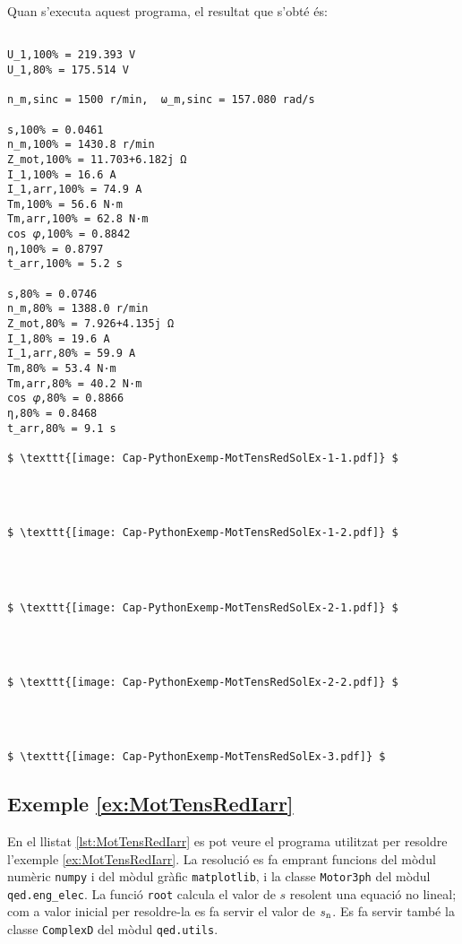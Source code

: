 Quan s'executa aquest programa, el resultat que s'obté és:
\lstset{
	language=,
	numbers=none,
	frame=none
}
\begin{lstlisting}[mathescape=true]
	
U_1,100% = 219.393 V
U_1,80% = 175.514 V

n_m,sinc = 1500 r/min,  ω_m,sinc = 157.080 rad/s

s,100% = 0.0461
n_m,100% = 1430.8 r/min
Z_mot,100% = 11.703+6.182j Ω
I_1,100% = 16.6 A
I_1,arr,100% = 74.9 A
Tm,100% = 56.6 N·m
Tm,arr,100% = 62.8 N·m
cos 𝜑,100% = 0.8842
η,100% = 0.8797
t_arr,100% = 5.2 s

s,80% = 0.0746
n_m,80% = 1388.0 r/min
Z_mot,80% = 7.926+4.135j Ω
I_1,80% = 19.6 A
I_1,arr,80% = 59.9 A
Tm,80% = 53.4 N·m
Tm,arr,80% = 40.2 N·m
cos 𝜑,80% = 0.8866
η,80% = 0.8468
t_arr,80% = 9.1 s

$ \texttt{[image: Cap-PythonExemp-MotTensRedSolEx-1-1.pdf]} $




$ \texttt{[image: Cap-PythonExemp-MotTensRedSolEx-1-2.pdf]} $




$ \texttt{[image: Cap-PythonExemp-MotTensRedSolEx-2-1.pdf]} $




$ \texttt{[image: Cap-PythonExemp-MotTensRedSolEx-2-2.pdf]} $




$ \texttt{[image: Cap-PythonExemp-MotTensRedSolEx-3.pdf]} $
\end{lstlisting} 



\hypertarget{exemple:MotTensRedIarr}{\subsection{Exemple \ref*{ex:MotTensRedIarr} \MotTensRedIarr}}
En el llistat \vref{lst:MotTensRedIarr} es pot veure el programa utilitzat per resoldre l'exemple \vref{ex:MotTensRedIarr}. La resolució es fa emprant funcions del mòdul numèric \texttt{numpy} i del mòdul gràfic \texttt{matplotlib}, i la classe \texttt{Motor3ph} del mòdul \texttt{qed.eng\_elec}. La funció \texttt{root} calcula el valor de $s$ resolent una equació no lineal; com a valor inicial per resoldre-la  es fa servir el valor de $s_\mathrm{n}$. Es fa servir també la classe \texttt{ComplexD} del mòdul \texttt{qed.utils}.


